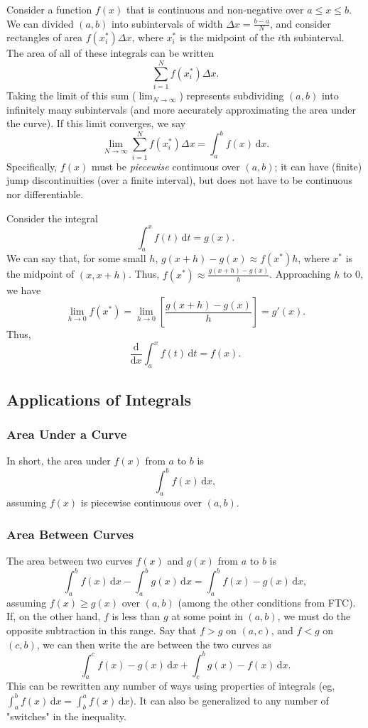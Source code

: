 \documentclass[12pt]{article}
\begin{document}
Consider a function $f(x)$ that is continuous and non-negative over $a \leq x \leq b$. We can divided $(a,b)$ into subintervals of width $\Delta x = \frac{b-a}{N}$, and consider rectangles of area $f(x^{*}_i) \Delta x$, where $x^{*}_i$ is the midpoint of the $i$th subinterval. The area  of all of these integrals can be written \[\sum_{i = 1}^N f(x^{*}_i) \Delta x.\] Taking the limit of this sum ($\lim_{N \to \infty}$) represents subdividing $(a,b)$ into infinitely many subintervals (and more accurately approximating the area under the curve). If this limit converges, we say \[\lim_{N \to \infty} \sum_{i = 1}^N f(x^{*}_i) \Delta x = \int_a^b f(x)\, \text{d}x.\] Specifically, $f(x)$ must be \textit{piecewise} continuous over $(a,b)$; it can have (finite) jump discontinuities (over a finite interval), but does not have to be continuous nor differentiable. 

Consider the integral \[\int_a^x f(t) \,\text{d}t = g(x).\] We can say that, for some small $h$, $g(x + h) - g(x) \approx f(x^*) h$, where $x^*$ is the midpoint of $(x, x+h)$. Thus, $f(x^*) \approx \frac{g(x+h) - g(x)}{h}$. Approaching $h$ to 0, we have \[\lim_{h \to 0} f(x^*) = \lim_{h \to 0} \left[\frac{g(x+h) - g(x)}{h}\right] = g'(x).\] Thus, \[\frac{\text{d}}{\text{d}x} \int_a^x f(t) \,\text{d}t = f(x).\]
\subsection{Applications of Integrals}
\subsubsection{Area Under a Curve}

In short, the area under $f(x)$ from $a$ to $b$ is \[\int_a^b f(x) \,\text{d}x,\] assuming $f(x)$ is piecewise continuous over $(a,b)$.

\subsubsection{Area Between Curves}

The area between two curves $f(x)$ and $g(x)$ from $a$ to $b$ is \[\int_a^b f(x) \,\text{d}x - \int_a^b g(x) \,\text{d}x = \int_a^b f(x) - g(x)\,\text{d}x,\] assuming $f(x) \geq g(x)$ over $(a,b)$ (among the other conditions from FTC). If, on the other hand, $f$ is less than $g$ at some point in $(a,b)$, we must do the opposite subtraction in this range. Say that $f > g$ on $(a,c)$, and $f < g$ on $(c,b)$, we can then write the are between the two curves as \[\int_a^c f(x) - g(x) \,\text{d}x + \int_c^b g(x) - f(x) \,\text{d}x.\] This can be rewritten any number of ways using properties of integrals (eg, $\int_a^b f(x)\,\text{d}x = \int_b^a f(x) \,\text{d}x$). It can also be generalized to any number of "switches" in the inequality.
\end{document}
